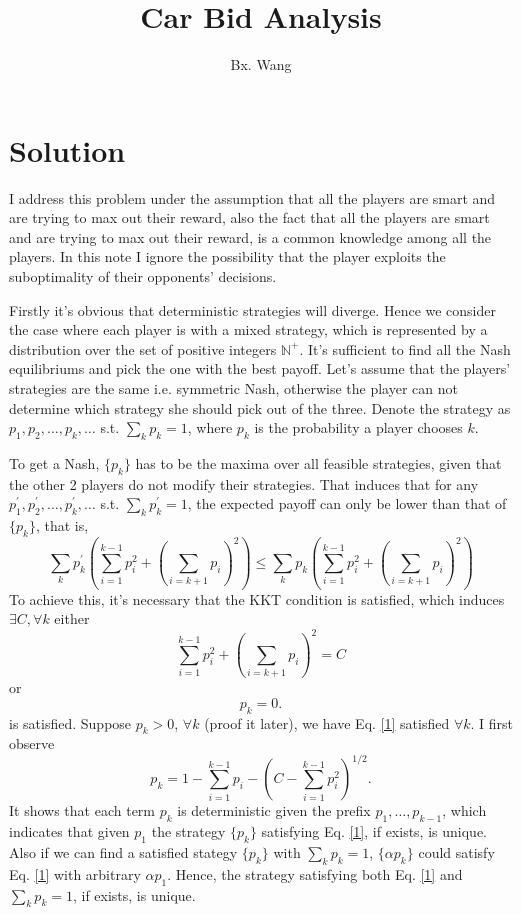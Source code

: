 \documentclass[a4paper]{article}
\title{Car Bid Analysis}
\author{Bx. Wang}
\begin{document}
\maketitle

\section{Solution}

I address this problem under the assumption that all the players are smart and are trying to max out their reward, also the fact that all the players are smart and are trying to max out their reward, is a common knowledge among all the players. In this note I ignore the possibility that the player exploits the suboptimality of their opponents' decisions.

Firstly it's obvious that deterministic strategies will diverge. Hence we consider the case where each player is with a mixed strategy, which is represented by a distribution over the set of positive integers $\mathbb{N}^+$. It's sufficient to find all the Nash equilibriums and pick the one with the best payoff. Let's assume that the players' strategies are the same i.e. symmetric Nash, otherwise the player can not determine which strategy she should pick out of the three. Denote the strategy as $p_1, p_2, \dots, p_k, \dots$ s.t. $\sum_k p_k=1$, where $p_k$ is the probability a player chooses $k$.

To get a Nash, $\{p_k\}$ has to be the maxima over all feasible strategies, given that the other 2 players do not modify their strategies. That induces that for any $p_1^\prime, p_2^\prime, \dots, p_k^\prime, \dots$ s.t. $\sum_k p_k^\prime=1$, the expected payoff can only be lower than that of $\{p_k\}$, that is,
$$ \sum_k p_k^\prime(\sum_{i=1}^{k-1}p_i^2+(\sum_{i=k+1}p_i)^2)\leq \sum_k p_k(\sum_{i=1}^{k-1}p_i^2+(\sum_{i=k+1}p_i)^2) $$
To achieve this, it's necessary that the KKT condition is satisfied, which induces $\exists C, \forall k$ either
\begin{equation}
\sum_{i=1}^{k-1}p_i^2+(\sum_{i=k+1}p_i)^2=C \label{1}
\end{equation}
or
$$p_k=0.$$
is satisfied. Suppose $p_k>0$, $\forall k$ (proof it later), we have Eq. \eqref{1} satisfied $\forall k$. I first observe
$$p_k=1-\sum_{i=1}^{k-1}p_i-(C-\sum_{i=1}^{k-1}p_i^2)^{1/2}.$$
It shows that each term $p_k$ is deterministic given the prefix $p_1, \dots, p_{k-1}$, which indicates that given $p_1$ the strategy $\{p_k\}$ satisfying Eq. \eqref{1}, if exists, is unique. Also if we can find a satisfied stategy $\{p_k\}$ with $\sum_k p_k=1$, $\{\alpha p_k\}$ could satisfy Eq. \eqref{1} with arbitrary $\alpha p_1$. Hence, the strategy satisfying both Eq. \eqref{1} and $\sum_k p_k=1$, if exists, is unique.
\end{document}
